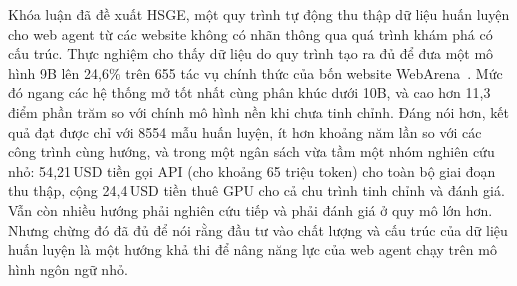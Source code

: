 \vspace{1em}
\noindent
Khóa luận đã đề xuất HSGE, một quy trình tự động thu thập dữ liệu huấn luyện
cho web agent từ các website không có nhãn thông qua quá trình khám phá có
cấu trúc. Thực nghiệm cho thấy dữ liệu do quy trình tạo ra đủ để đưa một mô hình 9B lên
24{,}6\% trên 655 tác vụ chính thức của bốn website WebArena~\cite{zhou2024webarena}. Mức đó ngang
các hệ thống mở tốt nhất cùng phân khúc dưới 10B, và cao hơn 11{,}3
điểm phần trăm so với chính mô hình nền khi chưa tinh chỉnh. Đáng nói hơn, kết quả đạt
được chỉ với 8554 mẫu huấn luyện, ít hơn khoảng năm lần so với các
công trình cùng hướng, và trong một ngân sách vừa tầm một nhóm nghiên cứu nhỏ:
54{,}21\,USD tiền gọi API (cho khoảng 65 triệu token) cho toàn bộ giai đoạn thu
thập, cộng 24{,}4\,USD tiền thuê GPU cho cả chu trình tinh chỉnh và đánh giá. Vẫn còn nhiều hướng phải nghiên cứu tiếp và phải đánh
giá ở quy mô lớn hơn. Nhưng chừng đó đã đủ để nói rằng đầu tư vào chất lượng
và cấu trúc của dữ liệu huấn luyện là một hướng khả thi để nâng năng lực của
web agent chạy trên mô hình ngôn ngữ nhỏ.
